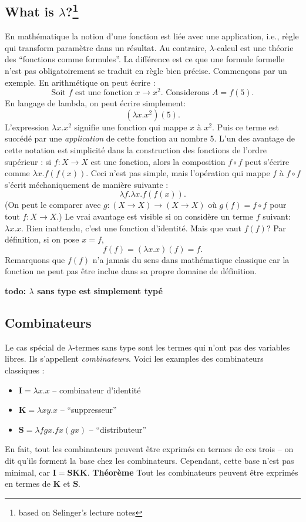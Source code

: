 \documentclass[12pt, a4paper]{article}
\begin{document}
\subsection*{What is $\lambda$?\footnote{based on Selinger's lecture notes}}
En mathématique la notion d'une fonction est liée avec une application, i.e., règle qui transform paramètre dans un résultat.
Au contraire, $\lambda$-calcul est une théorie des ``fonctions comme formules''. La différence est ce que une formule formelle n'est pas obligatoirement se traduit en règle bien précise.
Commençons par un exemple.
En arithmétique on peut écrire : 
$$\text{Soit $f$ est une fonction $x \to x^2$. Considerons $A = f(5)$.}$$
En langage de lambda, on peut écrire simplement: $$(\lambda x.x^2) (5).$$
L'expression $\lambda x.x^2$ signifie une fonction qui mappe $x$ à $x^2$.
Puis ce terme est succédé par une \emph{application} de cette fonction au nombre 5.
L'un des avantage de cette notation est simplicité dans la construction des fonctions de l'ordre supérieur : si $f: X \to X$ est une fonction, alors la composition $f \circ f$ peut s'écrire comme $\lambda x.f(f(x))$.
Ceci n'est pas simple, mais l'opération qui mappe $f$ à $f \circ f$ s'écrit méchaniquement de manière suivante :
$$\lambda f. \lambda x.f(f(x)).$$
(On peut le comparer avec $g: (X \to X) \to (X \to X)$ où $g(f) = f \circ f$ pour tout $f: X \to X$.)
Le vrai avantage est visible si on considère un terme $f$ suivant: $\lambda x.x$.
Rien inattendu, c'est une fonction d'identité.
Mais que vaut $f(f)$?
Par définition, si on pose $x = f$,
$$f(f) = (\lambda x.x)(f) = f.$$
Remarquons que $f(f)$ n'a jamais du sens dans mathématique classique car la fonction ne peut pas être inclue dans sa propre domaine de définition.

\textbf{todo: $\lambda$ sans type est simplement typé}

\subsection*{Combinateurs}
Le cas spécial de $\lambda$-termes sans type sont les termes qui n'ont pas des variables libres. Ils s'appellent \emph{combinateurs}.
Voici les examples des combinateurs classiques :
\begin{itemize}
	\item $\mathbf{I} = \lambda x. x$ -- combinateur d'identité
	\item $\mathbf{K} = \lambda x y. x$ -- ``suppresseur''
	\item $\mathbf{S} = \lambda fgx. fx(gx)$ -- ``distributeur''
\end{itemize}
En fait, tout les combinateurs peuvent être exprimés en termes de ces trois -- on dit qu'ils forment la base chez les combinateurs.
Cependant, cette base n'est pas minimal, car $\mathbf{I} = \mathbf{SKK}$.
\textbf{Théorème} Tout les combinateurs peuvent être exprimés en termes de $\mathbf{K}$ et $\mathbf{S}$.
\end{document}
